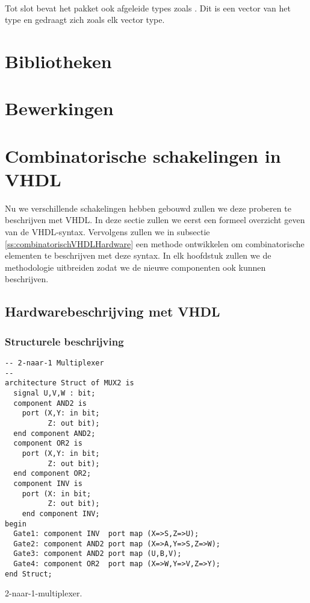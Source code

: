 \paragraph{}
Tot slot bevat het pakket ook afgeleide types zoals . Dit is een vector van het type  en gedraagt zich zoals elk vector type.
\section{Bibliotheken}
\section{Bewerkingen}
\section{Combinatorische schakelingen in VHDL}
Nu we verschillende schakelingen hebben gebouwd zullen we deze proberen te beschrijven met VHDL. In deze sectie zullen we eerst een formeel overzicht geven van de VHDL-syntax. Vervolgens zullen we in subsectie \ref{ss:combinatorischVHDLHardware} een methode ontwikkelen om combinatorische elementen te beschrijven met deze syntax. In elk hoofdstuk zullen we de methodologie uitbreiden zodat we de nieuwe componenten ook kunnen beschrijven.
\subsection{Hardwarebeschrijving met VHDL}
\subsubsection{Structurele beschrijving}
\begin{vhdlcode}[hbt]
\centering
\begin{lstlisting}
-- 2-naar-1 Multiplexer
--
architecture Struct of MUX2 is
  signal U,V,W : bit;
  component AND2 is
    port (X,Y: in bit;
          Z: out bit);
  end component AND2;
  component OR2 is
    port (X,Y: in bit;
          Z: out bit);
  end component OR2;
  component INV is
    port (X: in bit;
          Z: out bit);
    end component INV;
begin
  Gate1: component INV  port map (X=>S,Z=>U);
  Gate2: component AND2 port map (X=>A,Y=>S,Z=>W);
  Gate3: component AND2 port map (U,B,V);
  Gate4: component OR2  port map (X=>W,Y=>V,Z=>Y);
end Struct;
\end{lstlisting}
\caption{2-naar-1-multiplexer.}
\label{vhdl:bToAMultiplexer}
\end{vhdlcode}
